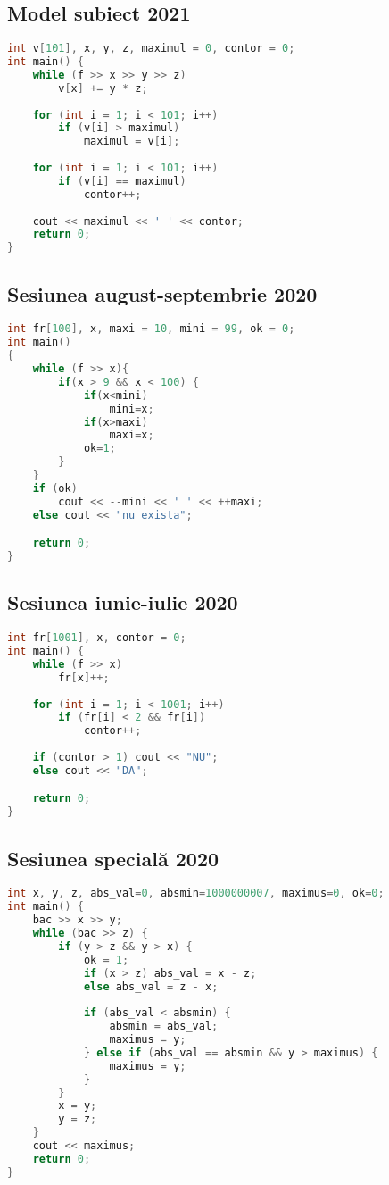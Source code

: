 \documentclass[10pt, a4paper, twocolumn]{article}
\begin{document}
\subsection*{Model subiect 2021}
\begin{lstlisting}[language=C++]
int v[101], x, y, z, maximul = 0, contor = 0;
int main() {
    while (f >> x >> y >> z)
        v[x] += y * z;
    
    for (int i = 1; i < 101; i++)
        if (v[i] > maximul)
            maximul = v[i];
    
    for (int i = 1; i < 101; i++)
        if (v[i] == maximul)
            contor++;
    
    cout << maximul << ' ' << contor;
    return 0;
}
\end{lstlisting}


\subsection*{Sesiunea august-septembrie 2020}
\begin{lstlisting}[language=C++]
int fr[100], x, maxi = 10, mini = 99, ok = 0;
int main()
{
    while (f >> x){
        if(x > 9 && x < 100) {
		    if(x<mini)
			    mini=x;
            if(x>maxi)
			    maxi=x;
            ok=1;
        }
    }
    if (ok)
        cout << --mini << ' ' << ++maxi;
    else cout << "nu exista";

    return 0;
}
\end{lstlisting}

\subsection*{Sesiunea iunie-iulie 2020}
\begin{lstlisting}[language=C++]
int fr[1001], x, contor = 0;
int main() {
    while (f >> x)
        fr[x]++;
    
    for (int i = 1; i < 1001; i++)
        if (fr[i] < 2 && fr[i])
            contor++;
    
    if (contor > 1) cout << "NU";
    else cout << "DA";

    return 0;
}
\end{lstlisting}

\newpage
\subsection*{Sesiunea specială 2020}
\begin{lstlisting}[language=C++]
int x, y, z, abs_val=0, absmin=1000000007, maximus=0, ok=0;
int main() {
    bac >> x >> y;
    while (bac >> z) {
        if (y > z && y > x) {
            ok = 1;
            if (x > z) abs_val = x - z;
            else abs_val = z - x;
            
            if (abs_val < absmin) {
                absmin = abs_val;
                maximus = y;
            } else if (abs_val == absmin && y > maximus) {
                maximus = y;
            }
        }
        x = y;
        y = z;
    }
    cout << maximus;
    return 0;
}
\end{lstlisting}
\end{document}
